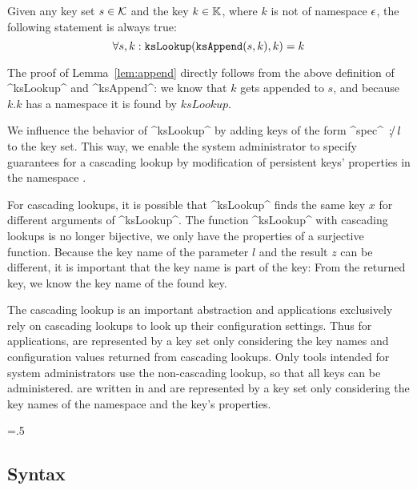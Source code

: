 \begin{lemma}
\label{lem:append}
Given any key set $s \in \mathcal{K}$ and the key $k \in \mathbb{K}$, where $k$ is not of namespace $\epsilon$, the following statement is always true:
\begin{equation}
\forall s,k : \texttt{ksLookup}(\texttt{ksAppend}(s, k), k) = k
\vspace{-1em}
\end{equation}
\end{lemma}

The proof of Lemma~\ref{lem:append} directly follows from the above definition of ^ksLookup^ and ^ksAppend^:
we know that $k$ gets appended to $s$, and because $k.k$ has a namespace it is found by $ksLookup$.


We influence the behavior of ^ksLookup^ by adding keys of the form ^spec^ $\operatorname*{\mathnormal{\colon\!\!\!/}} l$ to the key set.
This way, we enable the system administrator to specify guarantees for a cascading lookup by modification of persistent keys' properties in the namespace .

For cascading lookups, it is possible that ^ksLookup^ finds the same key $x$ for different arguments of ^ksLookup^.
The function ^ksLookup^ with cascading lookups is no longer bijective, we only have the properties of a surjective function.
Because the key name of the parameter $l$ and the result $z$ can be different, it is important that the key name is part of the key:
From the returned key, we know the key name of the found key.

The cascading lookup is an important abstraction and applications exclusively rely on cascading lookups to look up their configuration settings.
Thus for applications,  are represented by a key set only considering the key names and configuration values returned from cascading lookups.
Only tools intended for system administrators use the non-cascading lookup, so that all keys can be administered.
 are written in  and are represented by a key set only considering the key names of the namespace  and the key's properties.%
{\parfillskip=0pt \emergencystretch=.5\textwidth \par}



\subsection{Syntax}
\label{sec:syntax}

